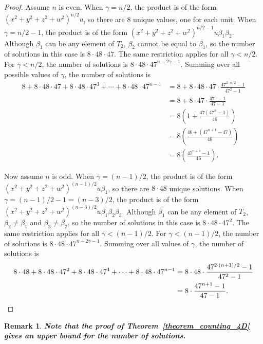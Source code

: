 \documentclass[12pt,table]{article}
\newtheorem{remark}[theorem]{Remark}
\numberwithin{equation}{section}
\newcommand{\myfrac}[2]{#1 / #2}
\begin{document}
\begin{landscape}
{{\begin{proof}
Assume $ n $ is even.
When $ \gamma = \myfrac{n}{2} $, the product is of the form
$ (x^2 + y^2 + z^2 + w^2)^{\myfrac{n}{2}} u  $, so there are 8 unique values, one for
each unit.
When $ \gamma = \myfrac{n}{2} - 1 $, the product is of the form
$ (x^2 + y^2 + z^2 + w^2)^{\myfrac{n}{2} - 1} u \beta_1 \beta_2  $. Although $ \beta_1 $
can be any element of $ T_2 $, $ \beta_2 $ cannot be equal to $ \overline{ \beta_1 } $,
so the number of solutions in this case is $ 8 \cdot 48 \cdot 47 $. The same restriction
applies for all $ \gamma < \myfrac{n}{2} $. For $ \gamma < \myfrac{n}{2} $,
the number of
solutions is $ 8 \cdot 48 \cdot 47^{n - 2\gamma - 1} $.
Summing over all possible values of $ \gamma $, the number of solutions is
\begin{align*}
8 + 8 \cdot 48 \cdot 47 + 8 \cdot 48 \cdot 47^3 + \dotsb
+ 8 \cdot 48 \cdot 47^{n-1}
&= 8 + 8 \cdot 48 \cdot 47 \cdot \frac{47^{2 \cdot \myfrac{n}{2} } - 1 }{47^2 - 1}
\\
&= 8 + 8 \cdot 47 \cdot \frac{47^{n} - 1 }{47 - 1}
\\
&= 8 \left(1 +  \frac{47 (47^{n} - 1 ) }{46}\right)
\\
&= 8 \left( \frac{46 + (47^{n+1} - 47 ) }{46}\right)
\\
&= 8 \left( \frac{47^{n+1} -1 }{46}\right).
\end{align*}

Now assume $ n $ is odd.
When $ \gamma = \myfrac{(n-1)}{2} $, the product is of the form
$ (x^2 + y^2 + z^2 + w^2)^{\myfrac{(n-1)}{2}} u \beta_1  $, so there are $ 8 \cdot 48 $
unique solutions.
When $ \gamma = \myfrac{(n-1)}{2} - 1 = \myfrac{(n-3)}{2}  $, the product is of the form
$ (x^2 + y^2 + z^2 + w^2)^{\myfrac{(n-3)}{2}} u \beta_1 \beta_2 \beta_3  $. Although $ \beta_1 $
can be any element of $ T_2 $, $ \beta_2 \neq \overline{ \beta_1 } $
and $ \beta_3 \neq \overline{ \beta_2 } $,
so the number of solutions in this case is $ 8 \cdot 48 \cdot 47^2 $. The same restriction
applies for all $ \gamma < \myfrac{(n-1)}{2} $. For $ \gamma < \myfrac{(n-1)}{2} $,
the number of solutions is $ 8 \cdot 48 \cdot 47^{n - 2\gamma - 1 } $.
Summing over all values of $ \gamma $, the number of solutions is
\begin{align*}
8 \cdot 48 + 8 \cdot 48 \cdot 47^2 + 8 \cdot 48 \cdot 47^4 + \dotsb
+ 8 \cdot 48 \cdot 47^{n-1}
&= 8 \cdot 48 \cdot \frac{47^{2 \cdot \myfrac{(n+1)}{2} } - 1 }{47^2 - 1}
\\
&= 8  \cdot \frac{47^{n+1} - 1 }{47 - 1}. \qedhere
\end{align*}
\end{proof}
\begin{remark}
\bf
Note that the proof of Theorem~\ref{theorem_counting_4D}
gives an upper bound for the number of solutions.
\end{remark}




}}
\end{landscape}
\end{document}
